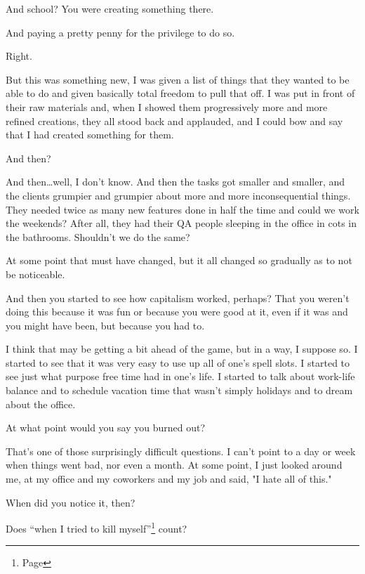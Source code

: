 \begin{paracol}{2}
\begin{leftcolumn}
\begin{ally}
And school? You were creating something there.
\end{ally}
And paying a pretty penny for the privilege to do so.

\begin{ally}
Right.
\end{ally}
But this was something new, I was given a list of things that they wanted to be able to do and given basically total freedom to pull that off. I was put in front of their raw materials and, when I showed them progressively more and more refined creations, they all stood back and applauded, and I could bow and say that I had created something for them.

\begin{ally}
And then?
\end{ally}
And then\ldots{}well, I don't know. And then the tasks got smaller and smaller, and the clients grumpier and grumpier about more and more inconsequential things. They needed twice as many new features done in half the time and could we work the weekends? After all, they had their QA people sleeping in the office in cots in the bathrooms. Shouldn't we do the same?

At some point that must have changed, but it all changed so gradually as to not be noticeable.

\begin{ally}
And then you started to see how capitalism worked, perhaps? That you weren't doing this because it was fun or because you were good at it, even if it was and you might have been, but because you had to.
\end{ally}
I think that may be getting a bit ahead of the game, but in a way, I suppose so. I started to see that it was very easy to use up all of one's spell slots. I started to see just what purpose free time had in one's life. I started to talk about work-life balance and to schedule vacation time that wasn't simply holidays and to dream about the office.

\newpage

\begin{ally}
At what point would you say you burned out?
\end{ally}
That's one of those surprisingly difficult questions. I can't point to a day or week when things went bad, nor even a month. At some point, I just looked around me, at my office and my coworkers and my job and said, "I hate all of this."

\begin{ally}
When did you notice it, then?
\end{ally}
Does ``when I tried to kill myself''\footnote{Page \pageref{selfharm:suicide}} count?


\end{leftcolumn}
\end{paracol}
